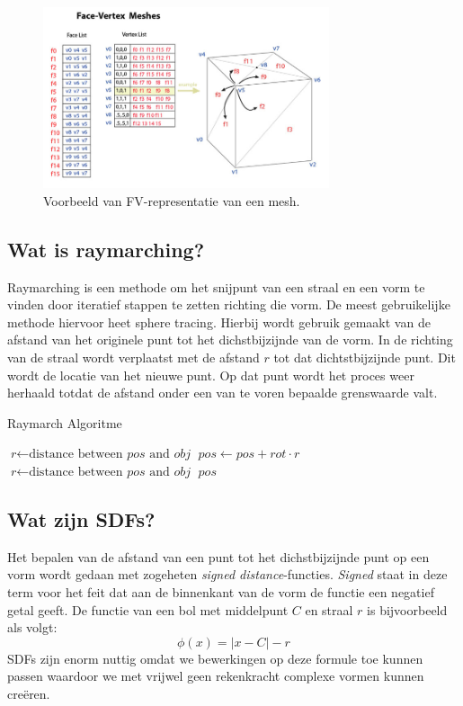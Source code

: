 \documentclass[12pt, a4paper]{article}
\begin{document}
\begin{figure}[h]
    \centering
    \includegraphics[width=0.75\textwidth]{Face-Vertex_Meshes.jpg}
    \caption{Voorbeeld van FV-representatie van een mesh.}
    \label{fig:face_vertex}
\end{figure}

\subsection{Wat is raymarching?}
Raymarching is een methode om het snijpunt van een straal en een vorm te vinden door iteratief stappen te zetten richting die vorm. De meest gebruikelijke methode hiervoor heet sphere tracing. Hierbij wordt gebruik gemaakt van de afstand van het originele punt tot het dichstbijzijnde van de vorm. In de richting van de straal wordt verplaatst met de afstand \(r\) tot dat dichtstbijzijnde punt. Dit wordt de locatie van het nieuwe punt. Op dat punt wordt het proces weer herhaald totdat de afstand onder een van te voren bepaalde grenswaarde valt.
\begin{algorithm}
\caption{Raymarch Algoritme}\label{euclid}
\begin{algorithmic}[1]
\State $\textit{r} \gets \text{distance between }\textit{pos}\text{ and }\textit{obj}$
\State $\textit{pos} \gets \textit{pos} + \textit{rot} \cdot r$
\State $\textit{r} \gets \text{distance between }\textit{pos}\text{ and }\textit{obj}$
\EndWhile
\Return $\textit{pos}$
\EndProcedure
\end{algorithmic}
\end{algorithm}

\subsection{Wat zijn SDFs?}
Het bepalen van de afstand van een punt tot het dichstbijzijnde punt op een vorm wordt gedaan met zogeheten \emph{signed distance}-functies. \emph{Signed} staat in deze term voor het feit dat aan de binnenkant van de vorm de functie een negatief getal geeft. De functie van een bol met middelpunt \(C\) en straal \(r\) is bijvoorbeeld als volgt:
\[\phi (x)=\left |x-C \right | -r\]
SDFs zijn enorm nuttig omdat we bewerkingen op deze formule toe kunnen passen waardoor we met vrijwel geen rekenkracht complexe vormen kunnen creëren. 
\end{document}
